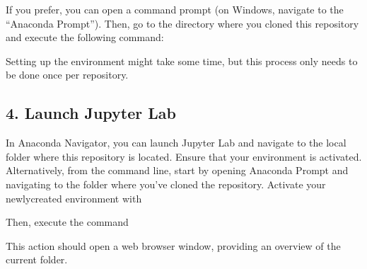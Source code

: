\documentclass[letterpaper,10pt,english]{sphinxmanual}
\begin{document}
\sphinxAtStartPar
If you prefer, you can open a command prompt (on Windows, navigate to the “Anaconda Prompt”). Then, go to the directory where you cloned this repository and execute the following command:

\begin{sphinxVerbatim}[commandchars=\\\{\}]
\PYGZbs{}\PYGZbs{}\PYGZbs{}     
\end{sphinxVerbatim}

\sphinxAtStartPar
Setting up the  environment might take some time, but this process only needs to be done once per repository.


\subsection{4. Launch Jupyter Lab}
\label{\detokenize{egm722_serenee/NI_Tourist_Map_doc:launch-jupyter-lab}}
\sphinxAtStartPar
In Anaconda Navigator, you can launch Jupyter Lab and navigate to the local folder where this repository is located. Ensure that your  environment is activated.
Alternatively, from the command line, start by opening Anaconda Prompt and navigating to the folder where you’ve cloned the repository. Activate your newly\sphinxhyphen{}created environment with

\begin{sphinxVerbatim}[commandchars=\\\{\}]
  
\end{sphinxVerbatim}

\sphinxAtStartPar
Then, execute the command

\begin{sphinxVerbatim}[commandchars=\\\{\}]
\end{sphinxVerbatim}

\sphinxAtStartPar
This action should open a web browser window, providing an overview of the current folder.
\end{document}
